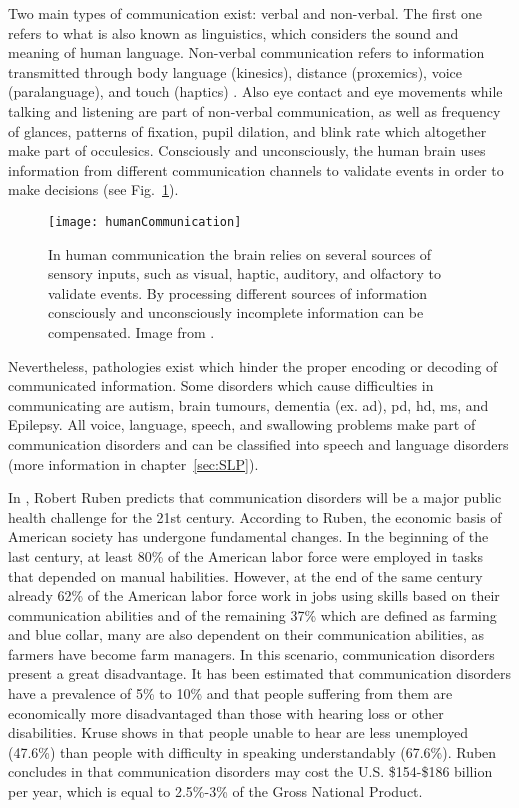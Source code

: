 Two main types of communication exist: verbal and non-verbal. The first one refers to what is also known as linguistics, which considers the sound and meaning of human language. Non-verbal communication refers to information transmitted through body language (kinesics), distance (proxemics), voice (paralanguage), and touch (haptics) \cite{Burgoon2016}. Also eye contact and eye movements while talking and listening are part of non-verbal communication, as well as frequency of glances, patterns of fixation, pupil dilation, and blink rate which altogether make part of occulesics. Consciously and unconsciously, the human brain uses information from different communication channels to validate events in order to make decisions (see Fig.~\ref{fig:humanCommunication}).

\begin{figure}
\centering
 \texttt{[image: humanCommunication]}
 \caption{In human communication the brain relies on several sources of sensory inputs,  such as visual, haptic, auditory, and  olfactory to validate events. By processing different sources of information consciously and unconsciously incomplete information can be compensated. Image from \cite{Poria2017}.}
 \label{fig:humanCommunication}
 \end{figure} 

Nevertheless, pathologies exist which hinder the proper encoding or decoding of communicated information. Some disorders which cause difficulties in communicating are autism, brain tumours, dementia (ex. \gls{ad}), \gls{pd}, \gls{hd}, \gls{ms}, and Epilepsy. All voice, language, speech, and swallowing problems make part of communication disorders and can be classified into speech and language disorders (more information in chapter~\ref{sec:SLP}). 

In \cite{Ruben2000}, Robert Ruben predicts that communication disorders will be a major public health challenge for the 21st century. According to Ruben, the economic basis of American society has undergone fundamental changes. In the beginning of the last century, at least 80\% of the American labor force were employed in tasks that depended on manual habilities. However, at the end of the same century already 62\% of the American labor force work in jobs using skills based on their communication abilities and of the remaining 37\% which are defined as farming and blue collar, many are also dependent on their communication abilities, as farmers have become farm managers. In this scenario, communication disorders present a great disadvantage. It has been estimated that communication disorders have a prevalence of 5\% to 10\% and that people suffering from them are economically more disadvantaged than those with hearing loss or other disabilities. Kruse shows in \cite{Kruse1997} that people unable to hear are less unemployed (47.6\%) than people with difficulty in speaking understandably (67.6\%). Ruben concludes in \cite{Ruben2000} that communication disorders may cost the U.S. \$154-\$186 billion per year, which is equal to 2.5\%-3\% of the Gross National Product.

